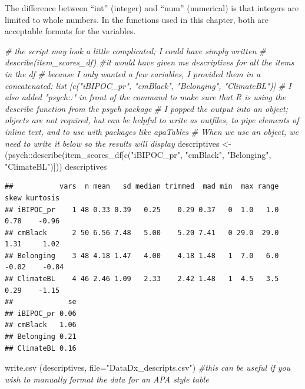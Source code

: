\documentclass[
]{book}
\newenvironment{Shaded}{\begin{snugshade}}{\end{snugshade}}
\newcommand{\AttributeTok}[1]{\textcolor[rgb]{0.77,0.63,0.00}{#1}}
\newcommand{\CommentTok}[1]{\textcolor[rgb]{0.56,0.35,0.01}{\textit{#1}}}
\newcommand{\FunctionTok}[1]{\textcolor[rgb]{0.00,0.00,0.00}{#1}}
\newcommand{\NormalTok}[1]{#1}
\newcommand{\OtherTok}[1]{\textcolor[rgb]{0.56,0.35,0.01}{#1}}
\newcommand{\SpecialCharTok}[1]{\textcolor[rgb]{0.00,0.00,0.00}{#1}}
\newcommand{\StringTok}[1]{\textcolor[rgb]{0.31,0.60,0.02}{#1}}
\begin{document}
The difference between ``int'' (integer) and ``num'' (numerical) is that integers are limited to whole numbers. In the functions used in this chapter, both are acceptable formats for the variables.

\begin{Shaded}
\begin{Highlighting}[]
\CommentTok{\# the script may look a little complicated; I could have simply written}
\CommentTok{\# describe(item\_scores\_df) \#it would have given me descriptives for all the items in the df}
\CommentTok{\# because I only wanted a few variables, I provided them in a concatenated: list [c("iBIPOC\_pr", "cmBlack", "Belonging", "ClimateBL")]}
\CommentTok{\# I also added "psych::" in front of the command to make sure that R is using the describe function from the psych package}
\CommentTok{\# I popped the output into an object; objects are not required, but can be helpful to write as outfiles, to pipe elements of inline text, and to use with packages like apaTables}
\CommentTok{\# When we use an object, we need to write it below so the results will display}
\NormalTok{descriptives }\OtherTok{\textless{}{-}}\NormalTok{ (psych}\SpecialCharTok{::}\FunctionTok{describe}\NormalTok{(item\_scores\_df[}\FunctionTok{c}\NormalTok{(}\StringTok{"iBIPOC\_pr"}\NormalTok{, }\StringTok{"cmBlack"}\NormalTok{, }\StringTok{"Belonging"}\NormalTok{, }\StringTok{"ClimateBL"}\NormalTok{)]))}
\NormalTok{descriptives}
\end{Highlighting}
\end{Shaded}

\begin{verbatim}
##           vars  n mean   sd median trimmed  mad min  max range  skew kurtosis
## iBIPOC_pr    1 48 0.33 0.39   0.25    0.29 0.37   0  1.0   1.0  0.78    -0.96
## cmBlack      2 50 6.56 7.48   5.00    5.20 7.41   0 29.0  29.0  1.31     1.02
## Belonging    3 48 4.18 1.47   4.00    4.18 1.48   1  7.0   6.0 -0.02    -0.84
## ClimateBL    4 46 2.46 1.09   2.33    2.42 1.48   1  4.5   3.5  0.29    -1.15
##             se
## iBIPOC_pr 0.06
## cmBlack   1.06
## Belonging 0.21
## ClimateBL 0.16
\end{verbatim}

\begin{Shaded}
\begin{Highlighting}[]
\FunctionTok{write.csv}\NormalTok{ (descriptives, }\AttributeTok{file=}\StringTok{"DataDx\_descripts.csv"}\NormalTok{) }\CommentTok{\#this can be useful if you wish to manually format the data for an APA style table}
\end{Highlighting}
\end{Shaded}
\end{document}
